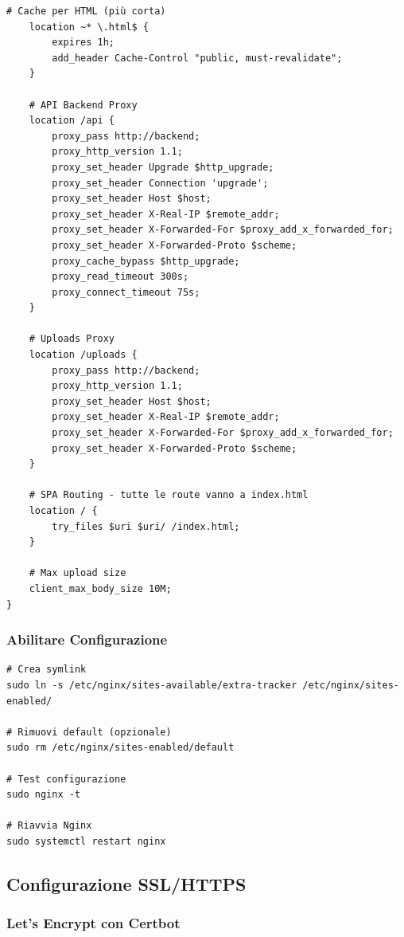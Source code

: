 \documentclass[11pt,a4paper]{article}
\begin{document}
\begin{lstlisting}[caption=/etc/nginx/sites-available/extra-tracker]
    # Cache per HTML (più corta)
    location ~* \.html$ {
        expires 1h;
        add_header Cache-Control "public, must-revalidate";
    }
    
    # API Backend Proxy
    location /api {
        proxy_pass http://backend;
        proxy_http_version 1.1;
        proxy_set_header Upgrade $http_upgrade;
        proxy_set_header Connection 'upgrade';
        proxy_set_header Host $host;
        proxy_set_header X-Real-IP $remote_addr;
        proxy_set_header X-Forwarded-For $proxy_add_x_forwarded_for;
        proxy_set_header X-Forwarded-Proto $scheme;
        proxy_cache_bypass $http_upgrade;
        proxy_read_timeout 300s;
        proxy_connect_timeout 75s;
    }
    
    # Uploads Proxy
    location /uploads {
        proxy_pass http://backend;
        proxy_http_version 1.1;
        proxy_set_header Host $host;
        proxy_set_header X-Real-IP $remote_addr;
        proxy_set_header X-Forwarded-For $proxy_add_x_forwarded_for;
        proxy_set_header X-Forwarded-Proto $scheme;
    }
    
    # SPA Routing - tutte le route vanno a index.html
    location / {
        try_files $uri $uri/ /index.html;
    }
    
    # Max upload size
    client_max_body_size 10M;
}
\end{lstlisting}

\subsubsection{Abilitare Configurazione}

\begin{lstlisting}[caption=Abilitare Site Nginx]
# Crea symlink
sudo ln -s /etc/nginx/sites-available/extra-tracker /etc/nginx/sites-enabled/

# Rimuovi default (opzionale)
sudo rm /etc/nginx/sites-enabled/default

# Test configurazione
sudo nginx -t

# Riavvia Nginx
sudo systemctl restart nginx
\end{lstlisting}

\subsection{Configurazione SSL/HTTPS}

\subsubsection{Let's Encrypt con Certbot}
\end{document}
